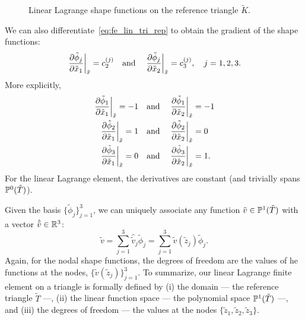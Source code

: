 \begin{figure}
  \centering
  \caption{Linear Lagrange shape functions on the reference triangle $\tilde K$.}
  \label{fig:fe_shape_tri_p1}
\end{figure}
We can also differentiate~\eqref{eq:fe_lin_tri_rep} to obtain the gradient of the shape functions:
\begin{equation*}
  \left. \frac{\partial \tilde \phi_j}{\partial \tilde x_1} \right|_{\tilde x} = c_2^{(j)} \quad \text{and} \quad  \left. \frac{\partial \tilde \phi_j}{\partial \tilde x_2} \right|_{\tilde x} = c_3^{(j)}, \quad j = 1,2,3.
\end{equation*}
More explicitly,
\begin{align*}
  \left. \frac{\partial \tilde \phi_1}{\partial \tilde x_1} \right|_{\tilde x} = -1
  \quad &\text{and} \quad
  \left. \frac{\partial \tilde \phi_1}{\partial \tilde x_2} \right|_{\tilde x} = -1\\
  \left. \frac{\partial \tilde \phi_2}{\partial \tilde x_1} \right|_{\tilde x} = 1
  \quad &\text{and} \quad
  \left. \frac{\partial \tilde \phi_2}{\partial \tilde x_2} \right|_{\tilde x} = 0\\
  \left. \frac{\partial \tilde \phi_3}{\partial \tilde x_1} \right|_{\tilde x} = 0
  \quad &\text{and} \quad
  \left. \frac{\partial \tilde \phi_3}{\partial \tilde x_2} \right|_{\tilde x} = 1.
\end{align*}
For the linear Lagrange element, the derivatives are constant (and trivially spans $\mathbb{P}^0(\tilde T)$).

Given the basis $\{ \tilde \phi_j \}_{j=1}^3$, we can uniquely associate any function $\tilde v \in \mathbb{P}^1(\tilde T)$ with a vector $\hat{\tilde v} \in \mathbb{R}^3$:
\begin{equation*}
  \tilde v = \sum_{j=1}^3 \hat{\tilde v}_j \tilde \phi_j = \sum_{j=1}^3 \tilde v(\tilde z_j) \tilde \phi_j.
\end{equation*}
Again, for the nodal shape functions, the degrees of freedom are the values of he functions at the nodes, $\{ \tilde v(\tilde z_j) \}_{j=1}^3$.  To summarize, our linear Lagrange finite element on a triangle is formally defined by (i) the domain --- the reference triangle $\tilde T$ ---, (ii) the linear function space --- the polynomial space $\mathbb{P}^1(\tilde T)$ ---, and (iii) the degrees of freedom --- the values at the nodes $\{\tilde z_1,\tilde z_2, \tilde z_3\}$.

